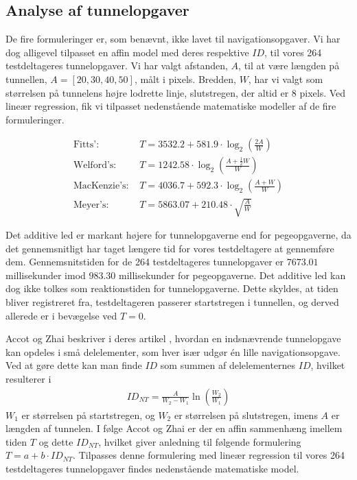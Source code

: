 \subsection*{Analyse af tunnelopgaver}
De fire formuleringer er, som benævnt, ikke lavet til navigationsopgaver. Vi har dog alligevel tilpasset en affin model med deres respektive $ID$, til vores 264 testdeltageres tunnelopgaver. Vi har valgt afstanden, $A$, til at være længden på tunnellen, $A=[20,30,40,50]$, målt i pixels. Bredden, $W$, har vi valgt som størrelsen på tunnelens højre lodrette linje, slutstregen, der altid er $8$ pixels. Ved lineær regression, fik vi tilpasset nedenstående matematiske modeller af de fire formuleringer.

\begin{align*}
\text{Fitts': } &T = 3532.2 + 581.9\cdot \log_2\left(\frac{2A}{W}\right)\\
\text{Welford's: } &T =  1242.58\cdot \log_2\left(\frac{A+\frac{1}{2}W}{W}\right)\\
\text{MacKenzie's: } &T = 4036.7 + 592.3\cdot \log_2\left(\frac{A+W}{W}\right)\\
\text{Meyer's: } &T = 5863.07 + 210.48 \cdot \sqrt{\frac{A}{W}}
\end{align*}

Det additive led er markant højere for tunnelopgaverne end for pegeopgaverne, da det gennemsnitligt har taget længere tid for vores testdeltagere at gennemføre dem. Gennemsnitstiden for de 264 testdeltageres tunnelopgaver er $7673.01$ millisekunder imod $983.30$ millisekunder for pegeopgaverne. Det additive led kan dog ikke tolkes som reaktionstiden for tunnelopgaverne. Dette skyldes, at tiden bliver registreret fra, testdeltageren passerer startstregen i tunnellen, og derved allerede er i bevægelse ved $T=0$.

Accot og Zhai beskriver i deres artikel \cite{accot1997}, hvordan en indsnævrende tunnelopgave kan opdeles i små delelementer, som hver især udgør én lille navigationsopgave. Ved at gøre dette kan man finde $ID$ som summen af delelementernes $ID$, hvilket resulterer i 
\begin{align*}
ID_{NT} = \frac{A}{W_2-W_1}\ln\left(\frac{W_2}{W_1}\right)
\end{align*}
$W_1$ er størrelsen på startstregen, og $W_2$ er størrelsen på slutstregen, imens $A$ er længden af tunnelen. I følge Accot og Zhai er der en affin sammenhæng imellem tiden $T$ og dette $ID_{NT}$, hvilket giver anledning til følgende formulering $T = a+b\cdot ID_{NT}$. Tilpasses denne formulering med lineær regression til vores 264 testdeltageres tunnelopgaver findes nedenstående matematiske model.

